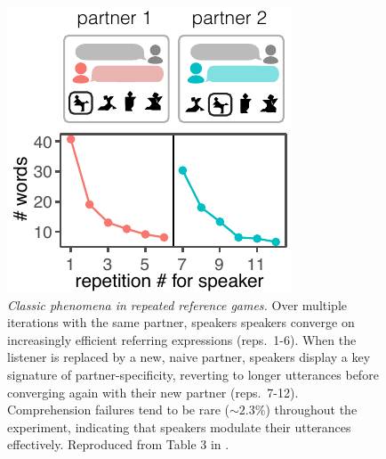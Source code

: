 \begin{figure}[t!]
\centering
\includegraphics[scale=1.3]{./figures/clark92_compressed}
\vspace{1em}
\caption{\textit{Classic phenomena in repeated reference games.} Over multiple iterations with the same partner, speakers speakers converge on increasingly efficient referring expressions (reps.~1-6). When the listener is replaced by a new, naive partner, speakers display a key signature of partner-specificity, reverting to longer utterances before converging again with their new partner (reps.~7-12). Comprehension failures tend to be rare ($\sim 2.3\%$) throughout the experiment, indicating that speakers modulate their utterances effectively. Reproduced from Table 3 in \protect{}.}
\label{fig:clark92}
\end{figure}

